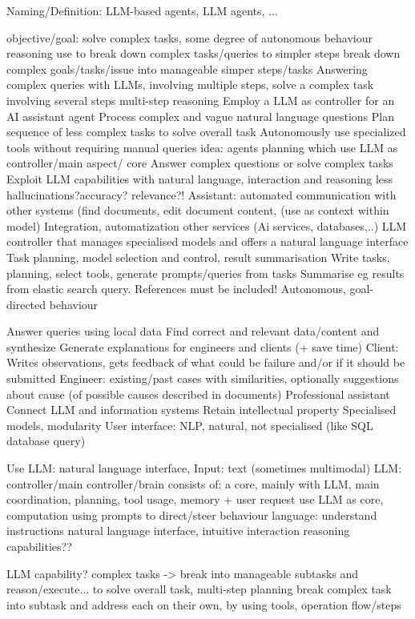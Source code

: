 \documentclass{article}
\begin{document}
Naming/Definition: LLM-based agents, LLM agents, ...

objective/goal: solve complex tasks, some degree of autonomous behaviour
reasoning use to break down complex tasks/queries to simpler steps
break down complex goals/tasks/issue into manageable simper steps/tasks
Answering complex queries with LLMs, involving multiple steps, solve a complex task involving several steps
multi-step reasoning
Employ a LLM as controller for an AI assistant agent
Process complex and vague natural language questions
Plan sequence of less complex tasks to solve overall task 
Autonomously use specialized tools without requiring manual queries
idea: agents planning which use LLM as controller/main aspect/ core
Answer complex questions or solve complex tasks
Exploit LLM capabilities with natural language, interaction and reasoning
less hallucinations?accuracy? relevance?!
Assistant: automated communication with other systems (find documents, edit document content, (use as context within model)
Integration, automatization other services (Ai services, databases,..)
LLM controller that manages specialised models and offers a natural language interface
Task planning, model selection and control, result summarisation
Write tasks, planning, select tools, generate prompts/queries from tasks
Summarise eg results from elastic search query. References must be included!
Autonomous, goal-directed behaviour

Answer queries using local data
Find correct and relevant data/content and synthesize
Generate explanations for engineers and clients (+ save time)
Client: Writes observations, gets feedback of what could be failure and/or if it should be submitted
Engineer: existing/past cases with similarities, optionally suggestions about cause (of possible causes described in documents)
Professional assistant
Connect LLM and information systems
Retain intellectual property
Specialised models, modularity
User interface: NLP, natural, not specialised (like SQL database query)

Use LLM: natural language interface, Input: text (sometimes multimodal)
LLM: controller/main controller/brain
consists of: a core, mainly with LLM, main coordination, planning, tool usage, memory + user request
use LLM as core, computation
using prompts to direct/steer behaviour
language: understand instructions
natural language interface, intuitive interaction
reasoning capabilities??


LLM capability? complex tasks -> break into manageable subtasks and reason/execute... to solve overall task, multi-step 
planning
break complex task into subtask and address each on their own, by using tools, operation flow/steps
\end{document}
